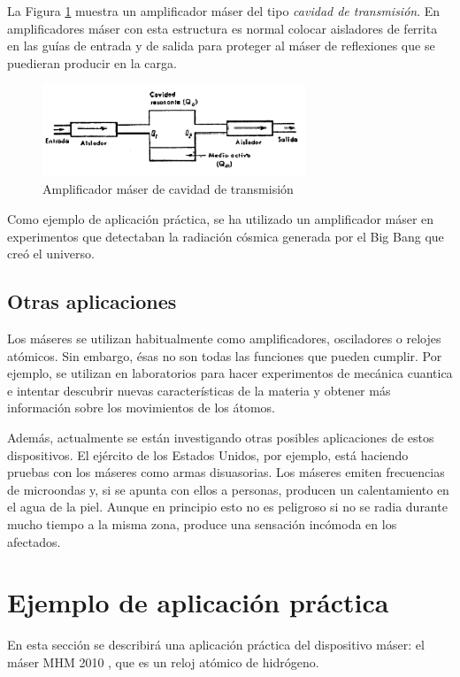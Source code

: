 La Figura \ref{fig:amplificador_cavidad} muestra un amplificador m\'aser del tipo \textit{cavidad de transmisi\'on}. En amplificadores m\'aser con esta estructura es normal colocar aisladores de ferrita en las gu\'ias de entrada y de salida para proteger al m\'aser de reflexiones que se puedieran producir en la carga. 

\begin{figure}[ht!!]
 \centering
 \includegraphics[width=0.7\textwidth]{./Utils/amplificador_transmision.png}
 \caption{Amplificador m\'aser de cavidad de transmisi\'on}
 \label{fig:amplificador_cavidad}
\end{figure}

Como ejemplo de aplicaci\'on pr\'actica, se ha utilizado un amplificador m\'aser en experimentos que detectaban la radiaci\'on c\'osmica generada por el Big Bang que cre\'o el universo.

\subsection{Otras aplicaciones}

Los m\'aseres se utilizan habitualmente como amplificadores, osciladores o relojes at\'omicos. Sin embargo, \'esas no son todas las funciones que pueden cumplir. Por ejemplo, se utilizan en laboratorios para hacer experimentos de mec\'anica cuantica e intentar descubrir nuevas caracter\'isticas de la materia y obtener m\'as informaci\'on sobre los movimientos de los \'atomos. 

Adem\'as, actualmente se est\'an investigando otras posibles aplicaciones de estos dispositivos. El ej\'ercito de los Estados Unidos, por ejemplo, est\'a haciendo pruebas con los m\'aseres como armas disuasorias. Los m\'aseres emiten frecuencias de microondas y, si se apunta con ellos a personas, producen un calentamiento en el agua de la piel. Aunque en principio esto no es peligroso si no se radia durante mucho tiempo a la misma zona, produce una sensaci\'on inc\'omoda en los afectados.

\newpage
\section{Ejemplo de aplicaci\'on pr\'actica}
En esta secci\'on se describir\'a una aplicaci\'on pr\'actica del dispositivo m\'aser: el m\'aser MHM 2010 \cite{MHM2010}, que es un reloj at\'omico de hidr\'ogeno.

